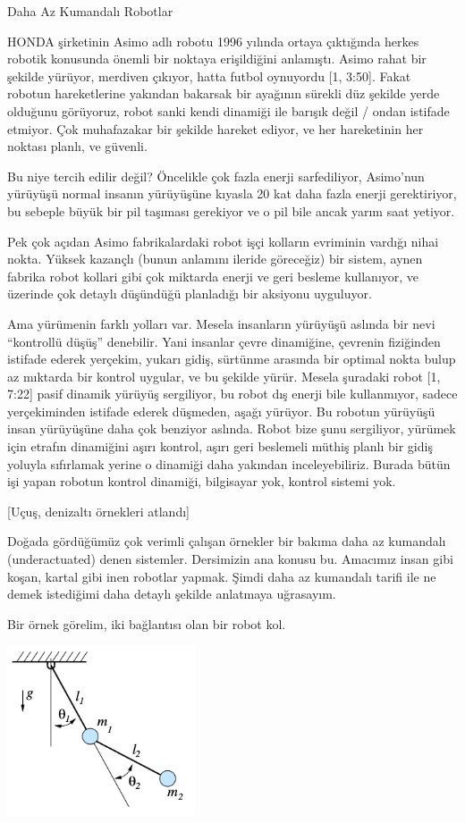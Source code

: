\documentclass[12pt,fleqn]{article}\usepackage{../../common}
\begin{document}
Daha Az Kumandalı Robotlar 

HONDA şirketinin Asimo adlı robotu 1996 yılında ortaya çıktığında herkes
robotik konusunda önemli bir noktaya erişildiğini anlamıştı. Asimo rahat
bir şekilde yürüyor, merdiven çıkıyor, hatta futbol oynuyordu [1,
3:50]. Fakat robotun hareketlerine yakından bakarsak bir ayağının sürekli
düz şekilde yerde olduğunu görüyoruz, robot sanki kendi dinamiği ile
barışık değil / ondan istifade etmiyor. Çok muhafazakar bir şekilde hareket
ediyor, ve her hareketinin her noktası planlı, ve güvenli. 

Bu niye tercih edilir değil? Öncelikle çok fazla enerji sarfediliyor,
Asimo'nun yürüyüşü normal insanın yürüyüşüne kıyasla 20 kat daha fazla
enerji gerektiriyor, bu sebeple büyük bir pil taşıması gerekiyor ve o pil
bile ancak yarım saat yetiyor. 

Pek çok açıdan Asimo fabrikalardaki robot işçi kolların evriminin vardığı
nihai nokta. Yüksek kazançlı (bunun anlamını ileride göreceğiz) bir sistem,
aynen fabrika robot kollari gibi çok miktarda enerji ve geri besleme
kullanıyor, ve üzerinde çok detaylı düşündüğü planladığı bir aksiyonu
uyguluyor.

Ama yürümenin farklı yolları var. Mesela insanların yürüyüşü aslında bir
nevi ``kontrollü düşüş'' denebilir. Yani insanlar çevre dinamiğine,
çevrenin fiziğinden istifade ederek yerçekim, yukarı gidiş, sürtünme
arasında bir optimal nokta bulup az mıktarda bir kontrol uygular, ve bu
şekilde yürür. Mesela şuradaki robot [1, 7:22] pasif dinamik yürüyüş
sergiliyor, bu robot dış enerji bile kullanmıyor, sadece yerçekiminden
istifade ederek düşmeden, aşağı yürüyor. Bu robotun yürüyüşü insan
yürüyüşüne daha çok benziyor aslında. Robot bize şunu sergiliyor, yürümek
için etrafın dinamiğini aşırı kontrol, aşırı geri beslemeli müthiş planlı
bir gidiş yoluyla sıfırlamak yerine o dinamiği daha yakından
inceleyebiliriz. Burada bütün işi yapan robotun kontrol dinamiği,
bilgisayar yok, kontrol sistemi yok.

[Uçuş, denizaltı örnekleri atlandı]

Doğada gördüğümüz çok verimli çalışan örnekler bir bakıma daha az kumandalı
(underactuated) denen sistemler. Dersimizin ana konusu bu. Amacımız insan
gibi koşan, kartal gibi inen robotlar yapmak.  Şimdi daha az kumandalı
tarifi ile ne demek istediğimi daha detaylı şekilde anlatmaya uğrasayım.

Bir örnek görelim, iki bağlantısı olan bir robot kol. 

\includegraphics[width=15em]{phy_control_1_01.png}
\end{document}
